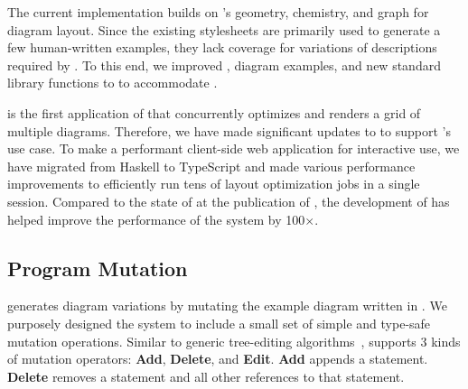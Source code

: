 The current \Edgeworth implementation builds on \Penrose's geometry, chemistry, and graph \Style for diagram layout. Since the existing \Style stylesheets are primarily used to generate a few human-written examples, they lack coverage for variations of \Substance descriptions required by \Edgeworth. To this end, we improved \Style, diagram examples, and new standard library functions to \Penrose to accommodate \Edgeworth.

\Edgeworth is the first application of \Penrose that concurrently optimizes and renders a grid of multiple diagrams. Therefore, we have made significant updates to \Penrose to support \Edgeworth's use case. To make \Edgeworth a performant client-side web application for interactive use, we have migrated from Haskell to TypeScript and made various performance improvements to efficiently run tens of layout optimization jobs in a single session. Compared to the state of \Penrose at the publication of \citet{penrose}, the development of \Edgeworth has helped improve the performance of the system by 100$\times$.


\subsection{Program Mutation}
\label{sec:edgeworth-mutation}

\Edgeworth generates diagram variations by mutating the example diagram written in \Substance. 
We purposely designed the system to include a small set of simple and type-safe mutation operations. Similar to generic tree-editing algorithms~\cite{gumtree}, \Edgeworth supports 3 kinds of mutation operators: \textbf{Add}, \textbf{Delete}, and \textbf{Edit}. \textbf{Add} appends a statement. \textbf{Delete} removes a statement and all other references to that statement. 


